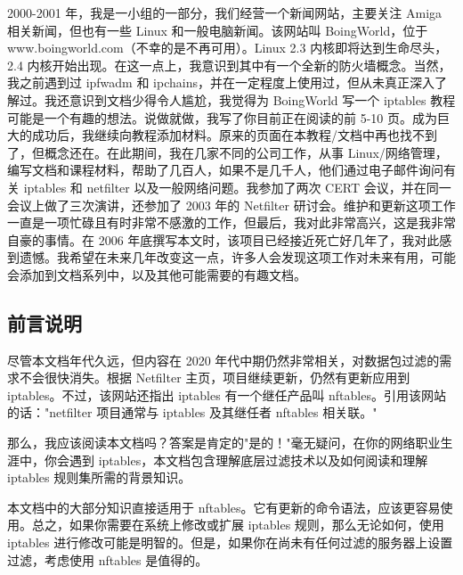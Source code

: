 \documentclass[12pt,UTF8]{ctexbook}
\begin{document}
2000-2001 年，我是一小组的一部分，我们经营一个新闻网站，主要关注 Amiga 相关新闻，但也有一些 Linux 和一般电脑新闻。该网站叫 BoingWorld，位于 www.boingworld.com（不幸的是不再可用）。Linux 2.3 内核即将达到生命尽头，2.4 内核开始出现。在这一点上，我意识到其中有一个全新的防火墙概念。当然，我之前遇到过 ipfwadm 和 ipchains，并在一定程度上使用过，但从未真正深入了解过。我还意识到文档少得令人尴尬，我觉得为 BoingWorld 写一个 iptables 教程可能是一个有趣的想法。说做就做，我写了你目前正在阅读的前 5-10 页。成为巨大的成功后，我继续向教程添加材料。原来的页面在本教程/文档中再也找不到了，但概念还在。在此期间，我在几家不同的公司工作，从事 Linux/网络管理，编写文档和课程材料，帮助了几百人，如果不是几千人，他们通过电子邮件询问有关 iptables 和 netfilter 以及一般网络问题。我参加了两次 CERT 会议，并在同一会议上做了三次演讲，还参加了 2003 年的 Netfilter 研讨会。维护和更新这项工作一直是一项忙碌且有时非常不感激的工作，但最后，我对此非常高兴，这是我非常自豪的事情。在 2006 年底撰写本文时，该项目已经接近死亡好几年了，我对此感到遗憾。我希望在未来几年改变这一点，许多人会发现这项工作对未来有用，可能会添加到文档系列中，以及其他可能需要的有趣文档。

\subsection{前言说明}
尽管本文档年代久远，但内容在 2020 年代中期仍然非常相关，对数据包过滤的需求不会很快消失。根据 Netfilter 主页，项目继续更新，仍然有更新应用到 iptables。不过，该网站还指出 iptables 有一个继任产品叫 nftables。引用该网站的话："netfilter 项目通常与 iptables 及其继任者 nftables 相关联。"

那么，我应该阅读本文档吗？答案是肯定的"是的！"毫无疑问，在你的网络职业生涯中，你会遇到 iptables，本文档包含理解底层过滤技术以及如何阅读和理解 iptables 规则集所需的背景知识。

本文档中的大部分知识直接适用于 nftables。它有更新的命令语法，应该更容易使用。总之，如果你需要在系统上修改或扩展 iptables 规则，那么无论如何，使用 iptables 进行修改可能是明智的。但是，如果你在尚未有任何过滤的服务器上设置过滤，考虑使用 nftables 是值得的。
\end{document}
